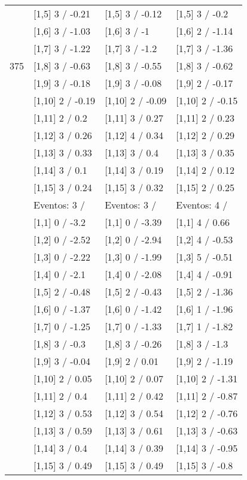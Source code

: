 \begin{table}
\begin{tabular}[t]{llll}
 & {}[1,5] 3  / -0.21 & {}[1,5] 3  / -0.12 & {}[1,5] 3  / -0.2\\
 & {}[1,6] 3  / -1.03 & {}[1,6] 3  / -1 & {}[1,6] 2  / -1.14\\
 & {}[1,7] 3  / -1.22 & {}[1,7] 3  / -1.2 & {}[1,7] 3  / -1.36\\
375 & {}[1,8] 3  / -0.63 & {}[1,8] 3  / -0.55 & {}[1,8] 3  / -0.62\\
\addlinespace
 & {}[1,9] 3  / -0.18 & {}[1,9] 3  / -0.08 & {}[1,9] 2  / -0.17\\
 & {}[1,10] 2  / -0.19 & {}[1,10] 2  / -0.09 & {}[1,10] 2  / -0.15\\
 & {}[1,11] 2  / 0.2 & {}[1,11] 3  / 0.27 & {}[1,11] 2  / 0.23\\
 & {}[1,12] 3  / 0.26 & {}[1,12] 4  / 0.34 & {}[1,12] 2  / 0.29\\
 & {}[1,13] 3  / 0.33 & {}[1,13] 3  / 0.4 & {}[1,13] 3  / 0.35\\
\addlinespace
 & {}[1,14] 3  / 0.1 & {}[1,14] 3  / 0.19 & {}[1,14] 2  / 0.12\\
 & {}[1,15] 3  / 0.24 & {}[1,15] 3  / 0.32 & {}[1,15] 2  / 0.25\\
 & Eventos:  3 / & Eventos:  3 / & Eventos:  4 /\\
 & {}[1,1] 0  / -3.2 & {}[1,1] 0  / -3.39 & {}[1,1] 4  / 0.66\\
 & {}[1,2] 0  / -2.52 & {}[1,2] 0  / -2.94 & {}[1,2] 4  / -0.53\\
\addlinespace
 & {}[1,3] 0  / -2.22 & {}[1,3] 0  / -1.99 & {}[1,3] 5  / -0.51\\
 & {}[1,4] 0  / -2.1 & {}[1,4] 0  / -2.08 & {}[1,4] 4  / -0.91\\
 & {}[1,5] 2  / -0.48 & {}[1,5] 2  / -0.43 & {}[1,5] 2  / -1.36\\
 & {}[1,6] 0  / -1.37 & {}[1,6] 0  / -1.42 & {}[1,6] 1  / -1.96\\
 & {}[1,7] 0  / -1.25 & {}[1,7] 0  / -1.33 & {}[1,7] 1  / -1.82\\
\addlinespace
500 & {}[1,8] 3  / -0.3 & {}[1,8] 3  / -0.26 & {}[1,8] 3  / -1.3\\
 & {}[1,9] 3  / -0.04 & {}[1,9] 2  / 0.01 & {}[1,9] 2  / -1.19\\
 & {}[1,10] 2  / 0.05 & {}[1,10] 2  / 0.07 & {}[1,10] 2  / -1.31\\
 & {}[1,11] 2  / 0.4 & {}[1,11] 2  / 0.42 & {}[1,11] 2  / -0.87\\
 & {}[1,12] 3  / 0.53 & {}[1,12] 3  / 0.54 & {}[1,12] 2  / -0.76\\
\addlinespace
 & {}[1,13] 3  / 0.59 & {}[1,13] 3  / 0.61 & {}[1,13] 3  / -0.63\\
 & {}[1,14] 3  / 0.4 & {}[1,14] 3  / 0.39 & {}[1,14] 3  / -0.95\\
 & {}[1,15] 3  / 0.49 & {}[1,15] 3  / 0.49 & {}[1,15] 3  / -0.8\\
\bottomrule
\end{tabular}
\end{table}
